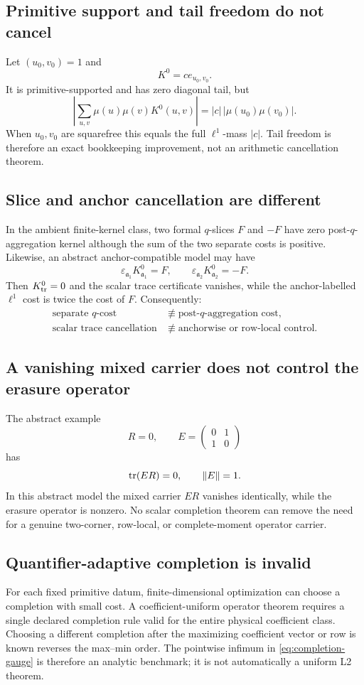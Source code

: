 \subsection{Primitive support and tail freedom do not cancel}

Let \((u_0,v_0)=1\) and
\[
 K^0=ce_{u_0,v_0}.
\]
It is primitive-supported and has zero diagonal tail, but
\[
 \left|
 \sum_{u,v}\mu(u)\mu(v)K^0(u,v)
 \right|
 =
 |c|\,|\mu(u_0)\mu(v_0)|.
\]
When \(u_0,v_0\) are squarefree this equals the full \(\ell^1\)-mass
\(|c|\).  Tail freedom is therefore an exact bookkeeping improvement, not
an arithmetic cancellation theorem.

\subsection{Slice and anchor cancellation are different}

In the ambient finite-kernel class, two formal \(q\)-slices \(F\) and
\(-F\) have zero post-\(q\)-aggregation kernel although the sum of the two
separate costs is positive.  Likewise, an abstract anchor-compatible model
may have
\[
 \varepsilon_{\mathfrak a_1}K_{\mathfrak a_1}^{0}=F,
 \qquad
 \varepsilon_{\mathfrak a_2}K_{\mathfrak a_2}^{0}=-F.
\]
Then \(K_{\rm tr}^{0}=0\) and the scalar trace certificate vanishes, while
the anchor-labelled \(\ell^1\) cost is twice the cost of \(F\).
Consequently:
\begin{align*}
 \text{separate \(q\)-cost}
 &\not\equiv
 \text{post-\(q\)-aggregation cost},\\
 \text{scalar trace cancellation}
 &\not\equiv
 \text{anchorwise or row-local control}.
\end{align*}

\subsection{A vanishing mixed carrier does not control the erasure operator}

The abstract example
\[
 R=0,
 \qquad
 E=
 \begin{pmatrix}
 0&1\\
 1&0
 \end{pmatrix}
\]
has
\[
 \operatorname{tr}(ER)=0,
 \qquad
 \|E\|=1.
\]
In this abstract model the mixed carrier \(ER\) vanishes identically,
while the erasure operator is nonzero.  No scalar completion theorem
can remove the need for a genuine two-corner, row-local, or complete-moment
operator carrier.

\subsection{Quantifier-adaptive completion is invalid}

For each fixed primitive datum, finite-dimensional optimization can choose
a completion with small cost.  A coefficient-uniform operator theorem
requires a single declared completion rule valid for the entire physical
coefficient class.  Choosing a different completion after the maximizing
coefficient vector or row is known reverses the max--min order.  The
pointwise infimum in \eqref{eq:completion-gauge} is therefore an analytic
benchmark; it is not automatically a uniform L2 theorem.
